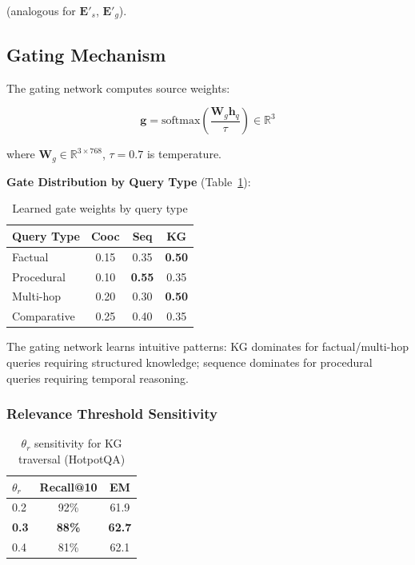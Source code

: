 \documentclass[10pt,twocolumn]{article}
\begin{document}
(analogous for $\mathbf{E}'_s$, $\mathbf{E}'_g$).


\subsection{Gating Mechanism}
\label{sec:gating}

The gating network computes source weights:

\begin{equation}
\mathbf{g} = \text{softmax}\left( \frac{\mathbf{W}_g \mathbf{h}_q}{\tau} \right) \in \mathbb{R}^3
\end{equation}

where $\mathbf{W}_g \in \mathbb{R}^{3 \times 768}$, $\tau=0.7$ is temperature.

\textbf{Gate Distribution by Query Type} (Table~\ref{tab:gate_distribution}):

\begin{table}[h]
\centering
\caption{Learned gate weights by query type}
\label{tab:gate_distribution}
\small
\begin{tabular}{@{}lccc@{}}
\toprule
\textbf{Query Type} & \textbf{Cooc} & \textbf{Seq} & \textbf{KG} \\
\midrule
Factual & 0.15 & 0.35 & \textbf{0.50} \\
Procedural & 0.10 & \textbf{0.55} & 0.35 \\
Multi-hop & 0.20 & 0.30 & \textbf{0.50} \\
Comparative & 0.25 & 0.40 & 0.35 \\
\bottomrule
\end{tabular}
\end{table}

The gating network learns intuitive patterns: KG dominates for factual/multi-hop queries requiring structured knowledge; sequence dominates for procedural queries requiring temporal reasoning.


\subsubsection{Relevance Threshold Sensitivity}
\label{sec:theta_sensitivity}

\begin{table}[h]
\centering
\caption{$\theta_r$ sensitivity for KG traversal (HotpotQA)}
\label{tab:theta}
\small
\begin{tabular}{@{}lcc@{}}
\toprule
$\theta_r$ & \textbf{Recall@10} & \textbf{EM} \\
\midrule
0.2 & 92\% & 61.9 \\
\textbf{0.3} & \textbf{88\%} & \textbf{62.7} \\
0.4 & 81\% & 62.1 \\
\bottomrule
\end{tabular}
\end{table}
\end{document}
